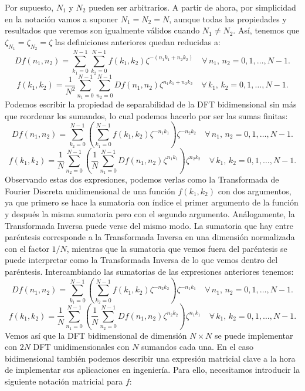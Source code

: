 \documentclass{article}
\begin{document}
Por supuesto, $N_1$ y $N_2$ pueden ser arbitrarios. A partir de ahora, por simplicidad en la notación vamos a suponer $N_1 = N_2 = N$, aunque todas las propiedades y resultados que veremos son igualmente válidos cuando $N_1 \neq N_2$.
Así, tenemos que $ \zeta_{N_{1}} =  \zeta_{N_{2}} =  \zeta$ las definiciones anteriores quedan reducidas a:
\[
    Df(n_1, n_2) = \sum_{k_1=0}^{N - 1}\sum_{k_2=0}^{N - 1} f(k_1, k_2) \zeta^{-(n_1k_1 + n_2k_2)} \quad \forall \, n_1, \, n_2 = 0,1,\dots , N - 1.
\]
\[
    f(k_1, k_2) = \frac{1}{N^2}\sum_{n_1=0}^{N-1} \sum_{n_2=0}^{N-1} Df(n_1, n_2)  \zeta^{n_1k_1 + n_2k_2} \quad \forall \, k_1, \, k_2 = 0,1,\dots , N - 1.
\]
Podemos escribir la propiedad de separabilidad de la DFT bidimensional sin más que reordenar los sumandos, lo cual podemos hacerlo por ser las sumas finitas:
\[
    Df(n_1, n_2) = \sum_{k_2=0}^{N - 1} \left( \sum_{k_1=0}^{N - 1} f(k_1, k_2) \zeta^{-n_1k_1} \right)  \zeta^{-n_2k_2} \quad \forall \, n_1, \, n_2 = 0,1,\dots , N - 1.
\]
\[
    f(k_1, k_2) = \frac{1}{N}\sum_{n_2=0}^{N-1} \left( \frac{1}{N} \sum_{n_1=0}^{N-1} Df(n_1, n_2)  \zeta^{n_1k_1} \right)  \zeta^{n_2k_2} \quad \forall \, k_1, \, k_2 = 0,1,\dots , N - 1.
\]
Observando estas dos expresiones, podemos verlas como la Transformada de Fourier Discreta unidimensional de una función $f(k_1, k_2)$ con dos argumentos, ya que primero se hace la sumatoria con índice el primer argumento de la función y después la misma sumatoria pero con el segundo argumento. Análogamente, la Transformada Inversa puede verse del mismo modo. La sumatoria que hay entre paréntesis corresponde a la Transformada Inversa en una dimensión normalizada con el factor $1 / N$, mientras que la sumatoria que vemos fuera del paréntesis se puede interpretar como la Transformada Inversa de lo que vemos dentro del paréntesis. 
Intercambiando las sumatorias de las expresiones anteriores tenemos:
\[
    Df(n_1, n_2) = \sum_{k_1=0}^{N - 1} \left( \sum_{k_2=0}^{N - 1} f(k_1, k_2) \zeta^{-n_2k_2} \right)  \zeta^{-n_1k_1} \quad \forall \, n_1, \, n_2 = 0,1,\dots , N - 1.
\]
\[
    f(k_1, k_2) = \frac{1}{N}\sum_{n_1=0}^{N-1} \left( \frac{1}{N} \sum_{n_2=0}^{N-1} Df(n_1, n_2)  \zeta^{n_2k_2} \right)  \zeta^{n_1k_1} \quad \forall \, k_1, \, k_2 = 0,1,\dots , N - 1.
\]
Vemos así que la DFT bidimensional de dimensión $N \times N$ se puede implementar con $2N$ DFT unidimensionales con $N$ sumandos cada una. 
En el caso bidimensional también podemos describir una expresión matricial clave a la hora de implementar sus aplicaciones en ingeniería. Para ello, necesitamos introducir la siguiente notación matricial para $f$:
\end{document}
